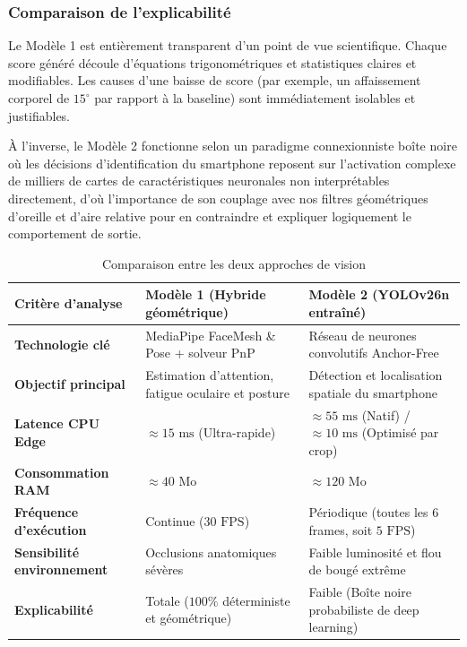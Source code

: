 \subsubsection{Comparaison de l’explicabilité}

Le Modèle 1 est entièrement transparent d'un point de vue scientifique. Chaque score généré découle d'équations trigonométriques et statistiques claires et modifiables. Les causes d'une baisse de score (par exemple, un affaissement corporel de $15^\circ$ par rapport à la baseline) sont immédiatement isolables et justifiables.

À l'inverse, le Modèle 2 fonctionne selon un paradigme connexionniste boîte noire où les décisions d'identification du smartphone reposent sur l'activation complexe de milliers de cartes de caractéristiques neuronales non interprétables directement, d'où l'importance de son couplage avec nos filtres géométriques d'oreille et d'aire relative pour en contraindre et expliquer logiquement le comportement de sortie.

\begin{table}[H]
\centering
\begin{tabular}{|l|p{6cm}|p{6cm}|}
\hline
\textbf{Critère d'analyse} & \textbf{Modèle 1 (Hybride géométrique)} & \textbf{Modèle 2 (YOLOv26n entraîné)} \\ \hline
\textbf{Technologie clé} & MediaPipe FaceMesh \& Pose + solveur PnP & Réseau de neurones convolutifs Anchor-Free \\ \hline
\textbf{Objectif principal} & Estimation d'attention, fatigue oculaire et posture & Détection et localisation spatiale du smartphone \\ \hline
\textbf{Latence CPU Edge} & $\approx 15\text{ ms}$ (Ultra-rapide) & $\approx 55\text{ ms}$ (Natif) / $\approx 10\text{ ms}$ (Optimisé par crop) \\ \hline
\textbf{Consommation RAM} & $\approx 40\text{ Mo}$ & $\approx 120\text{ Mo}$ \\ \hline
\textbf{Fréquence d'exécution} & Continue ($30\text{ FPS}$) & Périodique (toutes les 6 frames, soit $5\text{ FPS}$) \\ \hline
\textbf{Sensibilité environnement} & Occlusions anatomiques sévères & Faible luminosité et flou de bougé extrême \\ \hline
\textbf{Explicabilité} & Totale ($100\%$ déterministe et géométrique) & Faible (Boîte noire probabiliste de deep learning) \\ \hline
\end{tabular}
\caption{Comparaison entre les deux approches de vision}
\label{tab:comparaison_modeles}
\end{table}

